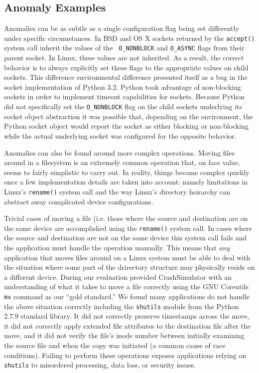     \subsection{Anomaly Examples}

    Anomalies can be as subtle as a single configuration flag being set
    differently under specific circumstances.  In BSD and OS X sockets returned
    by the {\tt accept()} system call inherit the values of the {\tt
      O\_NONBLOCK} and {\tt O\_ASYNC} flags from their parent socket.  In Linux,
    these values are not inherited.  As a result, the correct behavior is to
    always explicitly set these flags to the appropriate values on child
    sockets.  This difference environmental difference presented itself as a bug
    in the socket implementation of Python 3.2.  Python took advantage of
    non-blocking sockets in order to implement timeout capabilities for sockets.
    Because Python did not specifically set the {\tt O\_NONBLOCK} flag on the
    child sockets underlying its socket object abstraction it was possible that,
    depending on the environment, the Python socket object would report the
    socket as either blocking or non-blocking while the actual underlying socket
    was configured for the opposite behavior.

    Anomalies can also be found around more complex operations.  Moving files
    around in a filesystem is an extremely common operation that, on face value,
    seems to fairly simplistic to carry out.  In reality, things become complex
    quickly once a few implementation details are taken into account: namely
    limitations in Linux's {\tt rename()} system call and the way Linux's
    directory heirarchy can abstract away complicated device configurations.

    Trivial cases of moving a file (i.e. those where the source and destination
    are on the same device are accomplished using the {\tt rename()} system
    call.  In cases where the source and destination are not on the same device
    this system call fails and the application must handle the operation
    manually. This means that \emph{any} application that moves files around on
    a Linux system must be able to deal with the situation where some part of
    the drirectory structure may physically reside on a different device.
    During our evaluation provided CrashSimulator with an understanding of what
    it takes to move a file correctly using the GNU Coreutils {\tt mv} command
    as our ``gold standard.''  We found many applications do not handle the
    above situation correctly including the {\tt shutils} module from the Python
    2.7.9 standard library.  It did not correctly preserve timestamps across the
    move, it did not correctly apply extended file attributes to the destination
    file after the move, and it did not verify the file's inode number between
    initially examining the source file and when the copy was initiated (a
    common cause of race conditions).  Failing to perform these operations
    exposes applications relying on {\tt shutils} to misordered processing, data
    loss, or security issues.

